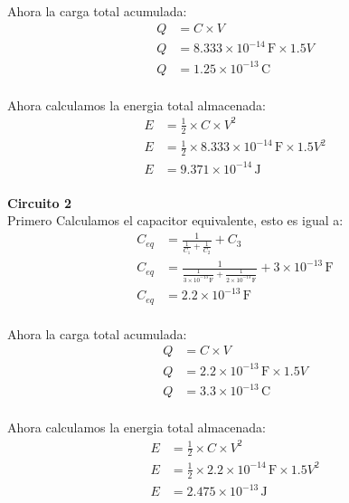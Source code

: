 \documentclass[12pt]{report}
\begin{document}
\begin{enumerate}
Ahora la carga total acumulada:\\
\begin{align*}
    Q&=C \times V\\[6pt]
    Q&=8.333 \times 10^{-14} \, \text{F} \times 1.5V \\[6pt]
    Q&=1.25 \times 10^{-13} \, \text{C}\\[6pt]
\end{align*}

Ahora calculamos la energia total almacenada:\\
\begin{align*}
    E&=\frac{1}{2}\times C\times V^2\\[6pt]
    E&=\frac{1}{2}\times 8.333 \times 10^{-14} \, \text{F} \times 1.5V^2\\[6pt]
    E&= 9.371 \times 10^{-14} \, \text{J}\\[6pt]
\end{align*}



    \textbf{Circuito 2}\\
    Primero Calculamos el capacitor equivalente, esto es igual a:\\
\begin{align*}
    C_{eq}&=\frac{1}{\frac{1}{C_1}+\frac{1}{C_2}}+C_3\\[6pt]
    C_{eq}&=\frac{1}{\frac{1}{3 \times 10^{-13} \, \text{F} }+\frac{1}{2 \times 10^{-13} \, \text{F}}}+ 3 \times 10^{-13} \, \text{F}\\[6pt]
    C_{eq}&=2.2 \times 10^{-13} \, \text{F}\\[6pt]
\end{align*}

Ahora la carga total acumulada:\\
\begin{align*}
    Q&=C \times V\\[6pt]
    Q&=2.2 \times 10^{-13} \, \text{F} \times 1.5V \\[6pt]
    Q&=3.3 \times 10^{-13} \, \text{C}\\[6pt]
\end{align*}

Ahora calculamos la energia total almacenada:\\
\begin{align*}
    E&=\frac{1}{2}\times C\times V^2\\[6pt]
    E&=\frac{1}{2}\times 2.2 \times 10^{-14} \, \text{F} \times 1.5V^2\\[6pt]
    E&= 2.475 \times 10^{-13} \, \text{J}\\[6pt]
\end{align*}



\end{enumerate}
\end{document}
